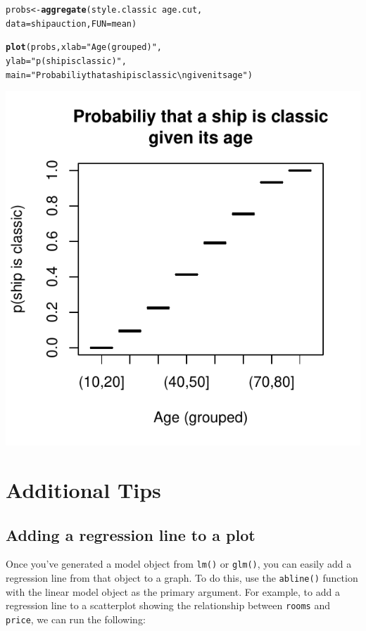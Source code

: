 \documentclass{tufte-book}\usepackage[]{graphicx}\usepackage[]{color}
\makeatletter
\def\maxwidth{ %
  \ifdim\Gin@nat@width>\linewidth
    \linewidth
  \else
    \Gin@nat@width
  \fi
}
\newcommand{\hlstr}[1]{\textcolor[rgb]{0.192,0.494,0.8}{#1}}%
\newcommand{\hlopt}[1]{\textcolor[rgb]{0,0,0}{#1}}%
\newcommand{\hlstd}[1]{\textcolor[rgb]{0.345,0.345,0.345}{#1}}%
\newcommand{\hlkwb}[1]{\textcolor[rgb]{0.69,0.353,0.396}{#1}}%
\newcommand{\hlkwc}[1]{\textcolor[rgb]{0.333,0.667,0.333}{#1}}%
\newcommand{\hlkwd}[1]{\textcolor[rgb]{0.737,0.353,0.396}{\textbf{#1}}}%
\newenvironment{kframe}{%
 \def\at@end@of@kframe{}%
 \ifinner\ifhmode%
  \def\at@end@of@kframe{\end{minipage}}%
  \begin{minipage}{\columnwidth}%
 \fi\fi%
 \def\FrameCommand##1{\hskip\@totalleftmargin \hskip-\fboxsep
 \colorbox{shadecolor}{##1}\hskip-\fboxsep
     \hskip-\linewidth \hskip-\@totalleftmargin \hskip\columnwidth}%
 \MakeFramed {\advance\hsize-\width
   \@totalleftmargin\z@ \linewidth\hsize
   \@setminipage}}%
 {\par\unskip\endMakeFramed%
 \at@end@of@kframe}
\newenvironment{knitrout}{}{} %
\makeatother
\begin{document}
\begin{footnotesize}
\begin{marginfigure}
\begin{tiny}
\begin{knitrout}
\begin{kframe}
\begin{alltt}
\hlstd{probs} \hlkwb{<-} \hlkwd{aggregate}\hlstd{(style.classic} \hlopt{~} \hlstd{age.cut,}
                   \hlkwc{data} \hlstd{= shipauction,} \hlkwc{FUN} \hlstd{= mean)}

\hlkwd{plot}\hlstd{(probs,} \hlkwc{xlab} \hlstd{=} \hlstr{"Age (grouped)"}\hlstd{,}
     \hlkwc{ylab} \hlstd{=} \hlstr{"p(ship is classic)"}\hlstd{,}
     \hlkwc{main} \hlstd{=} \hlstr{"Probabiliy that a ship is classic\textbackslash{}ngiven its age"}\hlstd{)}
\end{alltt}
\end{kframe}
\includegraphics[width=\maxwidth]{figure/unnamed-chunk-254-1} 

\end{knitrout}
\end{tiny}
\end{marginfigure}


\section{Additional Tips}

\subsection{Adding a regression line to a plot}


Once you've generated a model object from \texttt{lm()} or \texttt{glm()}, you can easily add a regression line from that object to a graph. To do this, use the \texttt{abline()} function with the linear model object as the primary argument. For example, to add a regression line to a scatterplot showing the relationship between \texttt{rooms} and \texttt{price}, we can run the following:


\end{footnotesize}
\end{document}
